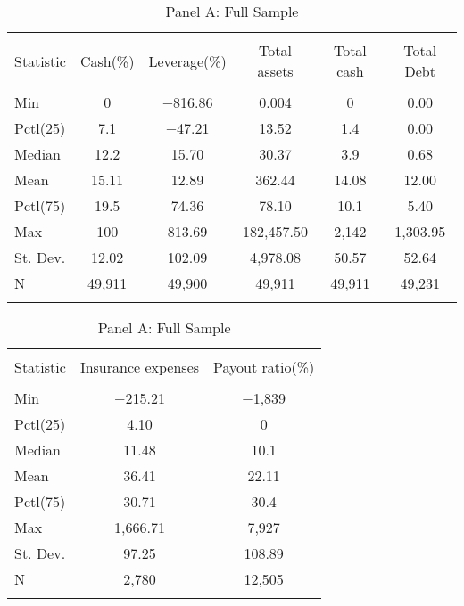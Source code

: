 
\begin{table}[!htbp] \centering 
  \caption{Panel A: Full Sample} 
  \label{} 
\begin{tabular}{@{\extracolsep{5pt}}lccccc} 
\\[-1.8ex]\hline 
\hline \\[-1.8ex] 
Statistic & Cash(\%) & Leverage(\%) & Total assets & Total cash & Total Debt \\ 
\hline \\[-1.8ex] 
Min & 0 & $-$816.86 & 0.004 & 0 & 0.00 \\ 
Pctl(25) & 7.1 & $-$47.21 & 13.52 & 1.4 & 0.00 \\ 
Median & 12.2 & 15.70 & 30.37 & 3.9 & 0.68 \\ 
Mean & 15.11 & 12.89 & 362.44 & 14.08 & 12.00 \\ 
Pctl(75) & 19.5 & 74.36 & 78.10 & 10.1 & 5.40 \\ 
Max & 100 & 813.69 & 182,457.50 & 2,142 & 1,303.95 \\ 
St. Dev. & 12.02 & 102.09 & 4,978.08 & 50.57 & 52.64 \\ 
N & 49,911 & 49,900 & 49,911 & 49,911 & 49,231 \\ 
\hline \\[-1.8ex] 
\end{tabular} 
\end{table} 

\begin{table}[!htbp] \centering 
  \caption{Panel A: Full Sample} 
  \label{} 
\begin{tabular}{@{\extracolsep{5pt}}lcc} 
\\[-1.8ex]\hline 
\hline \\[-1.8ex] 
Statistic & Insurance expenses & Payout ratio(\%) \\ 
\hline \\[-1.8ex] 
Min & $-$215.21 & $-$1,839 \\ 
Pctl(25) & 4.10 & 0 \\ 
Median & 11.48 & 10.1 \\ 
Mean & 36.41 & 22.11 \\ 
Pctl(75) & 30.71 & 30.4 \\ 
Max & 1,666.71 & 7,927 \\ 
St. Dev. & 97.25 & 108.89 \\ 
N & 2,780 & 12,505 \\ 
\hline \\[-1.8ex] 
\end{tabular} 
\end{table} 

